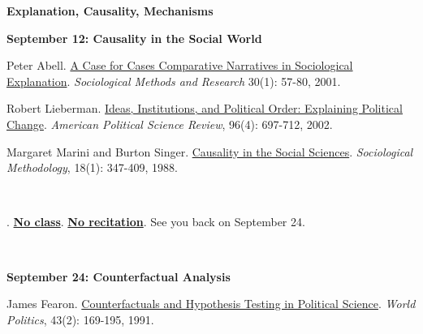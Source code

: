 \documentclass[letterpaper]{article}
\renewenvironment{itemize}{
  \begin{list}{}{
    \setlength{\leftmargin}{1.5em}
  }
}{
  \end{list}
}
\begin{document}
\begin{enumerate}
\item {\bf Explanation, Causality, Mechanisms}
		
		\begin{itemize}
		\item {\bf September 12: Causality in the Social World}
			\begin{itemize}
					\item[$\bullet$] Peter Abell. \href{http://journals.sagepub.com/doi/pdf/10.1177/0049124109339372}{A Case for Cases Comparative Narratives in Sociological Explanation}. \emph{Sociological Methods and Research} 30(1): 57-80, 2001. 
					\item[$\bullet$] Robert Lieberman. \href{http://www.jstor.org/stable/3117505}{Ideas, Institutions, and Political Order: Explaining Political Change}. \emph{American Political Science Review}, 96(4): 697-712, 2002. 
					\item[$\bullet$] Margaret Marini and Burton Singer. \href{http://www.jstor.org/stable/271053}{Causality in the Social Sciences}. \emph{Sociological Methodology}, 18(1): 347-409, 1988.
			\end{itemize}
		\end{itemize}

~\\
\item[] \begin{center}{\color{blue}{\bf National Holiday}. {\bf \underline{No class}}. {\bf \underline{No recitation}}. See you back on September 24.}\end{center}
~\\



		\begin{itemize}
		\item {\bf September 24: Counterfactual Analysis}
			\begin{itemize}
				\item[$\bullet$] James Fearon. \href{http://www.jstor.org/stable/2010470}{Counterfactuals and Hypothesis Testing in Political Science}. \emph{World Politics}, 43(2): 169-195, 1991.
			\end{itemize}
		\end{itemize}




\end{enumerate}
\end{document}
